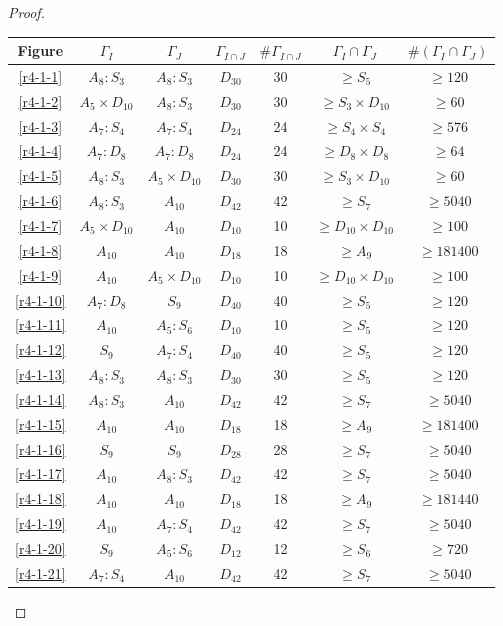 \begin{proof}
\begin{table}[h]
  \centering
  \begin{tabular}{|c|c|c|c|c|c|c|}
    \hline
    Figure & $\Gamma_{I}$ & $\Gamma_{J}$ & $\Gamma_{I \cap J}$ & $\#\Gamma_{I \cap J}$ & $\Gamma_{I} \cap \Gamma_{J}$ & $\#(\Gamma_{I} \cap \Gamma_{J})$ \\ \hline
    \ref{r4-1-1} & $A_8 : S_3$ & $A_8 : S_3$ & $D_{30}$ & 30 & $\ge S_5$ & $\ge 120$ \\ \hline
    \ref{r4-1-2} & $A_5 \times D_{10}$ & $A_8 : S_3$ & $D_{30}$ & 30 & $\ge S_3 \times D_{10}$ & $\ge 60$ \\ \hline
    \ref{r4-1-3} & $A_7 : S_4$ & $A_7 : S_4$ & $D_{24}$ & 24 & $\ge S_4 \times S_4$ & $\ge 576$ \\ \hline
    \ref{r4-1-4} & $A_7 : D_8$ & $A_7 : D_8$ & $D_{24}$ & 24 & $\ge D_8 \times D_8$ & $\ge 64$ \\ \hline
    \ref{r4-1-5} & $A_8 : S_3$ & $A_5 \times D_{10}$ & $D_{30}$ & 30 & $\ge S_3 \times D_{10}$ & $\ge 60$ \\ \hline
    \ref{r4-1-6} & $A_8 : S_3$ & $A_{10}$ & $D_{42}$ & 42 & $\ge S_7$ & $\ge 5040$ \\ \hline
    \ref{r4-1-7} & $A_5 \times D_{10}$ & $A_{10}$ & $D_{10}$ & 10 & $\ge D_{10} \times D_{10}$ & $\ge 100$ \\ \hline
    \ref{r4-1-8} & $A_{10}$ & $A_{10}$ & $D_{18}$ & 18 & $\ge A_9$ & $\ge 181400$ \\ \hline
    \ref{r4-1-9} & $A_{10}$ & $A_5 \times D_{10}$ & $D_{10}$ & 10 & $\ge D_{10} \times D_{10}$ & $\ge 100$ \\ \hline
    \ref{r4-1-10}& $A_7 : D_8$ & $S_9$ & $D_{40}$ & 40 & $\ge S_5$ & $\ge 120$ \\ \hline
    \ref{r4-1-11}& $A_{10}$ & $A_5 : S_6$ & $D_{10}$ & 10 & $\ge S_5$ & $\ge 120$ \\ \hline
    \ref{r4-1-12}& $S_9$ & $A_7 :S_4$ & $D_{40}$ & 40 & $\ge S_5$ & $\ge 120$ \\ \hline
    \ref{r4-1-13}& $A_8 : S_3$ & $A_8 : S_3$ & $D_{30}$ & 30 & $\ge S_5$ & $\ge 120$ \\ \hline
    \ref{r4-1-14}& $A_8 : S_3$ & $A_{10}$ & $D_{42}$ & 42 & $\ge S_7$ & $\ge 5040$ \\ \hline
    \ref{r4-1-15}& $A_{10}$ & $A_{10}$ & $D_{18}$ & 18 & $\ge A_9$ & $\ge 181400$ \\ \hline
    \ref{r4-1-16}& $S_9$ & $S_9$ & $D_{28}$ & 28 & $\ge S_7$ & $\ge 5040$ \\ \hline
    \ref{r4-1-17}& $A_{10}$ & $A_8 : S_3$ & $D_{42}$ & 42 & $\ge S_7$ & $\ge 5040$ \\ \hline
    \ref{r4-1-18}& $A_{10}$ & $A_{10}$ & $D_{18}$ & 18 & $\ge A_9$ & $\ge 181440$ \\ \hline
    \ref{r4-1-19}& $A_{10}$ & $A_7 : S_4$ & $D_{42}$ & 42 & $\ge S_7$ & $\ge 5040$ \\ \hline
    \ref{r4-1-20}& $S_9$ & $A_5 : S_6$ & $D_{12}$ & 12 & $\ge S_6$ & $\ge 720$ \\ \hline
    \ref{r4-1-21}& $A_7 : S_{4}$ & $A_{10}$ & $D_{42}$ & 42 & $\ge S_7$ & $\ge 5040$ \\ \hline


\end{tabular}
\end{table}
\end{proof}
